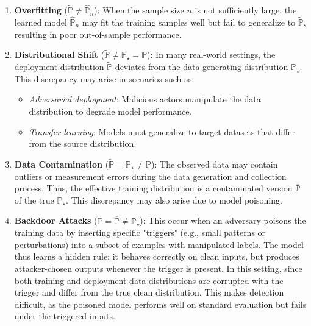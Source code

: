 \documentclass[11pt]{report}
\begin{document}
\begin{enumerate}

    \item \textbf{Overfitting} ($\tilde{\mathbb{P}} \neq \hat{\mathbb{P}}_n$):  
    When the sample size $n$ is not sufficiently large, the learned model $\hat{\mathbb{P}}_n$ may fit the training samples well but fail to generalize to $\tilde{\mathbb{P}}$, resulting in poor out-of-sample performance.  

    \item \textbf{Distributional Shift} ($\tilde{\mathbb{P}} \neq \mathbb{P}_\star = \overline{\mathbb{P}}$):  
    In many real-world settings, the deployment distribution $\tilde{\mathbb{P}}$ deviates from the data-generating distribution $\mathbb{P}_\star$. This discrepancy may arise in scenarios such as:
    \begin{itemize}[left=1em]
        \item \textit{Adversarial deployment}: Malicious actors manipulate the data distribution to degrade model performance.
        \item \textit{Transfer learning}: Models must generalize to target datasets that differ from the source distribution.
    \end{itemize}

    \item \textbf{Data Contamination} ($\tilde{\mathbb{P}} = \mathbb{P}_\star \neq \overline{\mathbb{P}}$):  
    The observed data may contain outliers or measurement errors during the data generation and collection process. Thus, the effective training distribution is a contaminated version $\overline{\mathbb{P}}$ of the true $\mathbb{P}_\star$. This discrepancy may also arise due to model poisoning.

    \item \textbf{Backdoor Attacks} ($\tilde{\mathbb{P}} = \overline{\mathbb{P}} \neq \mathbb{P}_\star$): 
    This occur when an adversary poisons the training data by inserting specific "triggers" (e.g., small patterns or perturbations) into a subset of examples with manipulated labels. The model thus learns a hidden rule: it behaves correctly on clean inputs, but produces attacker-chosen outputs whenever the trigger is present. In this setting, since both training and deployment data distributions are corrupted with the trigger and differ from the true clean distribution. This makes detection difficult, as the poisoned model performs well on standard evaluation but fails under the triggered inputs.
    
\end{enumerate}
\end{document}
